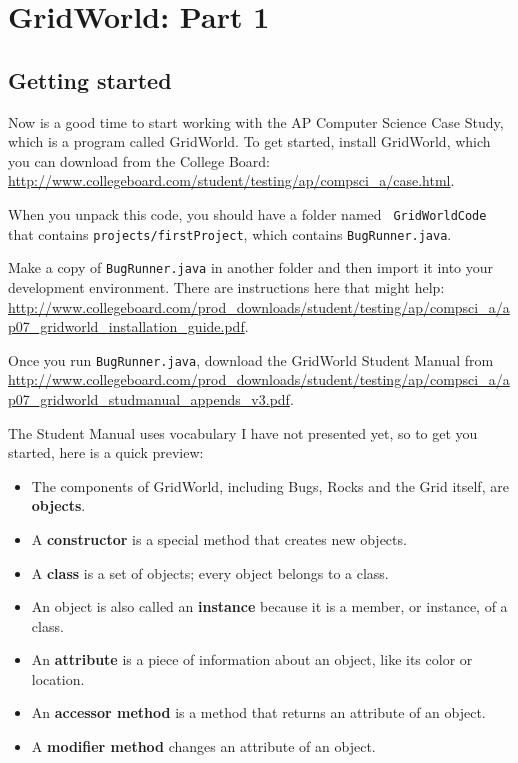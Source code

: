 \chapter{GridWorld: Part 1}
\label{gridworld}

\section{Getting started}

Now is a good time to start working with the AP Computer Science Case
Study, which is a program called GridWorld.  To get started, install
GridWorld, which you can download from the College Board:
\url{http://www.collegeboard.com/student/testing/ap/compsci_a/case.html}.

When you unpack this code, you should have a folder named {\tt
  GridWorldCode} that contains {\tt projects/firstProject}, which
contains {\tt BugRunner.java}.

Make a copy of {\tt BugRunner.java} in another folder and then import it
into your development environment.  There are instructions here that
might help: \url{http://www.collegeboard.com/prod_downloads/student/testing/ap/compsci_a/ap07_gridworld_installation_guide.pdf}.

Once you run {\tt BugRunner.java}, download the GridWorld Student
Manual from \url{http://www.collegeboard.com/prod_downloads/student/testing/ap/compsci_a/ap07_gridworld_studmanual_appends_v3.pdf}.

The Student Manual uses vocabulary I have not presented yet, so to
get you started, here is a quick preview:

\begin{itemize}

\item The components of GridWorld, including Bugs, Rocks and the Grid
itself, are {\bf objects}.

\item A {\bf constructor} is a special method that creates new objects.

\item A {\bf class} is a set of objects; every object belongs to a
class.

\item An object is also called an {\bf instance} because it is a member,
or instance, of a class.

\item An {\bf attribute} is a piece of information about an object, like
its color or location.

\item An {\bf accessor method} is a method that returns an attribute of
an object.

\item A {\bf modifier method} changes an attribute of an object.

\end{itemize}

